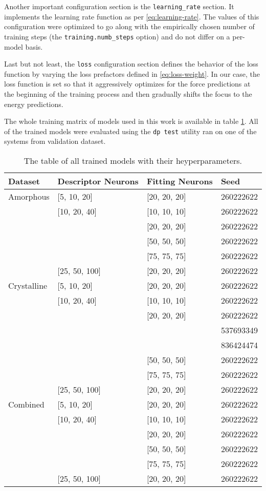 Another important configuration section is the \texttt{learning\_rate}
section. It implements the learning rate function as per
\eqref{eq:learning-rate}. The values of this configuration were optimized to
go along with the empirically chosen number of training steps
(the \texttt{training.numb\_steps} option) and do not differ on a per-model
basis.

Last but not least, the \texttt{loss} configuration section defines the
behavior of the loss function by varying the loss prefactors defined in
\eqref{eq:loss-weight}. In our case, the loss function is set so that it
aggressively optimizes for the force predictions at the beginning of the
training process and then gradually shifts the focus to the energy
predictions.

The whole training matrix of models used in this work is available in table
\ref{tab:models}. All of the trained models were evaluated using the
\texttt{dp test} utility ran on one of the systems from validation dataset.

\begin{table}
  \begin{tabularx}{\textwidth}{llll}
    \toprule
    Dataset & Descriptor Neurons & Fitting Neurons & Seed \\
    \midrule
    Amorphous & [5, 10, 20] & [20, 20, 20] & 260222622 \\
     & [10, 20, 40] & [10, 10, 10] & 260222622 \\
     & & [20, 20, 20] & 260222622 \\
     & & [50, 50, 50] & 260222622 \\
     & & [75, 75, 75] & 260222622 \\
     & [25, 50, 100] & [20, 20, 20] & 260222622 \\
    \midrule
    Crystalline & [5, 10, 20] & [20, 20, 20] & 260222622 \\
     & [10, 20, 40] & [10, 10, 10] & 260222622 \\
     & & [20, 20, 20] & 260222622 \\
     & & & 537693349 \\
     & & & 836424474 \\
     & & [50, 50, 50] & 260222622 \\
     & & [75, 75, 75] & 260222622 \\
     & [25, 50, 100] & [20, 20, 20] & 260222622 \\
    \bottomrule
    Combined & [5, 10, 20] & [20, 20, 20] & 260222622 \\
     & [10, 20, 40] & [10, 10, 10] & 260222622 \\
     & & [20, 20, 20] & 260222622 \\
     & & [50, 50, 50] & 260222622 \\
     & & [75, 75, 75] & 260222622 \\
     & [25, 50, 100] & [20, 20, 20] & 260222622 \\
  \end{tabularx}
  \caption{The table of all trained models with their heyperparameters.}
  \label{tab:models}
\end{table}

